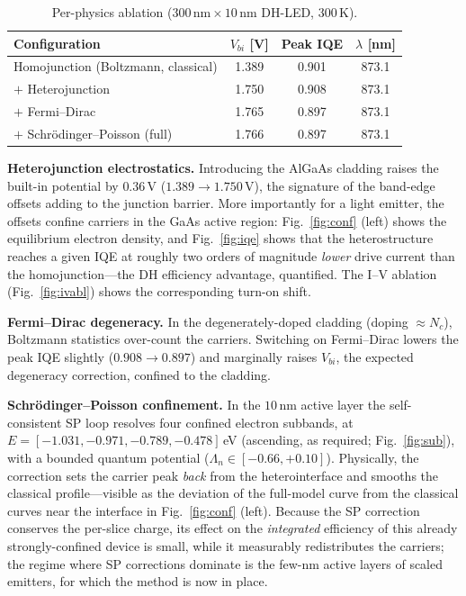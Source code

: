 \documentclass[conference]{IEEEtran}
\begin{document}
\begin{table}[t]
\caption{Per-physics ablation ($300\,\text{nm}\times10\,\text{nm}$ DH-LED, 300\,K).}
\label{tab:ablation}
\centering
\renewcommand{\arraystretch}{1.25}
\begin{tabular}{@{}lccc@{}}
\toprule
Configuration & $V_{bi}$ [V] & Peak IQE & $\lambda$ [nm] \\
\midrule
Homojunction (Boltzmann, classical) & 1.389 & 0.901 & 873.1 \\
$+$ Heterojunction                  & 1.750 & 0.908 & 873.1 \\
$+$ Fermi--Dirac                    & 1.765 & 0.897 & 873.1 \\
$+$ Schr\"odinger--Poisson (full)   & 1.766 & 0.897 & 873.1 \\
\bottomrule
\end{tabular}
\end{table}

\textbf{Heterojunction electrostatics.} Introducing the AlGaAs cladding raises the
built-in potential by $0.36\,$V ($1.389\to1.750\,$V), the signature of the
band-edge offsets adding to the junction barrier. More importantly for a light
emitter, the offsets confine carriers in the GaAs active region: Fig.~\ref{fig:conf}
(left) shows the equilibrium electron density, and Fig.~\ref{fig:iqe} shows that
the heterostructure reaches a given IQE at roughly two orders of magnitude
\emph{lower} drive current than the homojunction---the DH efficiency advantage,
quantified. The I--V ablation (Fig.~\ref{fig:ivabl}) shows the corresponding
turn-on shift.

\textbf{Fermi--Dirac degeneracy.} In the degenerately-doped cladding
(doping $\approx N_c$), Boltzmann statistics over-count the carriers. Switching on
Fermi--Dirac lowers the peak IQE slightly ($0.908\to0.897$) and marginally raises
$V_{bi}$, the expected degeneracy correction, confined to the cladding.

\textbf{Schr\"odinger--Poisson confinement.} In the $10\,$nm active layer the
self-consistent SP loop resolves four confined electron subbands, at
$E=[-1.031,-0.971,-0.789,-0.478]\,$eV (ascending, as required; Fig.~\ref{fig:sub}),
with a bounded quantum potential ($\Lambda_n\in[-0.66,+0.10]$). Physically, the
correction sets the carrier peak \emph{back} from the heterointerface and smooths
the classical profile---visible as the deviation of the full-model curve from the
classical curves near the interface in Fig.~\ref{fig:conf} (left). Because the SP
correction conserves the per-slice charge, its effect on the \emph{integrated}
efficiency of this already strongly-confined device is small, while it measurably
redistributes the carriers; the regime where SP corrections dominate is the
few-nm active layers of scaled emitters, for which the method is now in place.
\end{document}
